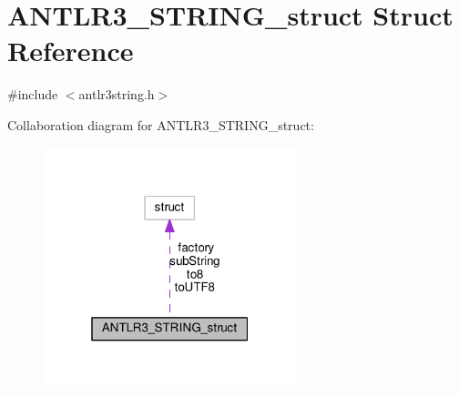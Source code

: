 \hypertarget{struct_a_n_t_l_r3___s_t_r_i_n_g__struct}{\section{A\-N\-T\-L\-R3\-\_\-\-S\-T\-R\-I\-N\-G\-\_\-struct Struct Reference}
\label{struct_a_n_t_l_r3___s_t_r_i_n_g__struct}
}


{\ttfamily \#include $<$antlr3string.\-h$>$}



Collaboration diagram for A\-N\-T\-L\-R3\-\_\-\-S\-T\-R\-I\-N\-G\-\_\-struct\-:
\nopagebreak
\begin{figure}[H]
\begin{center}
\leavevmode
\includegraphics[width=208pt]{struct_a_n_t_l_r3___s_t_r_i_n_g__struct__coll__graph}
\end{center}
\end{figure}
